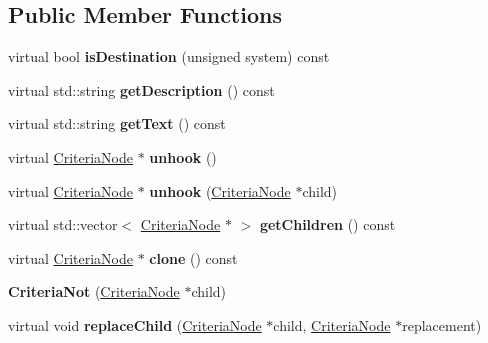 \subsection*{Public Member Functions}
\begin{DoxyCompactItemize}
\item 
virtual bool {\bfseries is\+Destination} (unsigned system) const \hypertarget{classCriteriaNot_a8e0db9f0e64e7e8c6f7959823c9a59c0}{}\label{classCriteriaNot_a8e0db9f0e64e7e8c6f7959823c9a59c0}

\item 
virtual std\+::string {\bfseries get\+Description} () const \hypertarget{classCriteriaNot_a8db0da448db286cf71eb13e5f27c3f06}{}\label{classCriteriaNot_a8db0da448db286cf71eb13e5f27c3f06}

\item 
virtual std\+::string {\bfseries get\+Text} () const \hypertarget{classCriteriaNot_ab10d853d0290b7be4a66b7bbc9e19e53}{}\label{classCriteriaNot_ab10d853d0290b7be4a66b7bbc9e19e53}

\item 
virtual \hyperlink{classCriteriaNode}{Criteria\+Node} $\ast$ {\bfseries unhook} ()\hypertarget{classCriteriaNot_a9f28a5e977c74beccdbe25bc1b25b435}{}\label{classCriteriaNot_a9f28a5e977c74beccdbe25bc1b25b435}

\item 
virtual \hyperlink{classCriteriaNode}{Criteria\+Node} $\ast$ {\bfseries unhook} (\hyperlink{classCriteriaNode}{Criteria\+Node} $\ast$child)\hypertarget{classCriteriaNot_ac8005c34b7331ee8e2b34266fdf8496d}{}\label{classCriteriaNot_ac8005c34b7331ee8e2b34266fdf8496d}

\item 
virtual std\+::vector$<$ \hyperlink{classCriteriaNode}{Criteria\+Node} $\ast$ $>$ {\bfseries get\+Children} () const \hypertarget{classCriteriaNot_a48661ea7fe2f4df53595520e8135b9b0}{}\label{classCriteriaNot_a48661ea7fe2f4df53595520e8135b9b0}

\item 
virtual \hyperlink{classCriteriaNode}{Criteria\+Node} $\ast$ {\bfseries clone} () const \hypertarget{classCriteriaNot_a02ba2c9ece00303b97950945db5d6247}{}\label{classCriteriaNot_a02ba2c9ece00303b97950945db5d6247}

\item 
{\bfseries Criteria\+Not} (\hyperlink{classCriteriaNode}{Criteria\+Node} $\ast$child)\hypertarget{classCriteriaNot_a71229da162e1f73354f8a88e3f9ff12a}{}\label{classCriteriaNot_a71229da162e1f73354f8a88e3f9ff12a}

\item 
virtual void {\bfseries replace\+Child} (\hyperlink{classCriteriaNode}{Criteria\+Node} $\ast$child, \hyperlink{classCriteriaNode}{Criteria\+Node} $\ast$replacement)\hypertarget{classCriteriaNot_a1f2203bdad999647a9b2910630f3ba4a}{}\label{classCriteriaNot_a1f2203bdad999647a9b2910630f3ba4a}

\end{DoxyCompactItemize}
